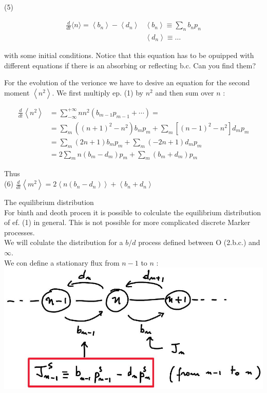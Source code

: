 \documentclass[10pt]{article}
\begin{document}
(5)

$$
\begin{array}{ll}
\frac{d}{d t}\langle n\rangle=\left\langle b_{n}\right\rangle-\left\langle d_{n}\right\rangle & \left\langle b_{n}\right\rangle \equiv \sum_{n} b_{n} p_{n} \\
& \left\langle d_{n}\right\rangle \equiv \ldots
\end{array}
$$

with some initial conditions. Notice that this equation has to be opuipped with different equations if there is an absorbing or reflecting b.c. Can you find them?

For the evolution of the verionce we have to desive an equation for the second moment $\left\langle n^{2}\right\rangle$. We first multiply ep. (1) by $n^{2}$ and then sum over $n$ :

$$
\begin{aligned}
\frac{d}{d t}\left\langle n^{2}\right\rangle & =\sum_{-\infty}^{+\infty} n n^{2}\left(b_{m-1} p_{m-1}+\cdots\right)= \\
& =\sum_{m}\left((n+1)^{2}-n^{2}\right) b_{m} p_{m}+\sum_{m}\left[(n-1)^{2}-n^{2}\right] d_{m} p_{m} \\
& =\sum_{m}(2 n+1) b_{m} p_{m}+\sum_{m}(-2 n+1) d_{m} p_{m} \\
& =2 \sum_{m} n\left(b_{m}-d_{m}\right) p_{m}+\sum_{m}\left(b_{m}+d_{m}\right) p_{m}
\end{aligned}
$$

Thus\\
(6) $\frac{d}{d t}\left\langle m^{2}\right\rangle=2\left\langle n\left(b_{n}-d_{n}\right)\right\rangle+\left\langle b_{n}+d_{n}\right\rangle$

The equilibrium distribution\\
For binth and deoth procen it is possible to colculate the equilibrium distribution of ef. (1) in general. This is not possible for more complicated discrete Marker processes.\\
We will colulate the distribution for a $b / d$ process defined between O (2.b.c.) and $\infty$.\\
We con define a stationary flux from $n-1$ to $n$ :\\
\includegraphics[max width=\textwidth, center]{2025_10_17_b1062645fdca57c84af1g-05}
\end{document}
